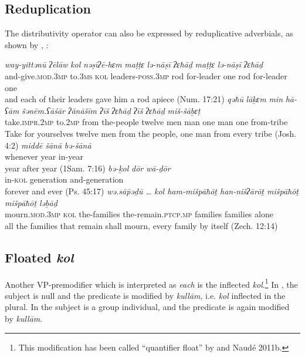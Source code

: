 \documentclass[output=paper]{langsci/langscibook}
\begin{document}
\subsection{Reduplication}%
The distributivity operator can also be expressed by reduplicative adverbials, as shown by \citealt{BeckStechow2006}, \citealt{NaudeMillerNaude2015}:

\ea%
    \label{ex:doron:48}
    \ea
    \gll \textit{way-yittənū}             \textit{ʔēlāw}   \textit{kol}  \textit{nəṣīʔē-hɛm}           \textit{maṭṭɛ} \textit{lə-nāṣī}      \textit{ʔɛħāḏ} \textit{maṭṭɛ} \textit{lə-nāṣī}    \textit{ʔɛħāḏ}\\
         and-give.\textsc{mod.3mp}  to.\textsc{3ms}  \textsc{kol} leaders-\textsc{poss.3mp} rod  for-leader one    rod   for-leader one\\
    \glt and each of their leaders gave him a rod apiece (Num. 17:21)
    \ex  
    \gll \textit{qəħū}                  \textit{lāḵɛm}  \textit{min}   \textit{hā-ʕām}      \textit{šənēm.ʕāśār} \textit{ʔănāšīm} \textit{ʔīš}    \textit{ʔɛħāḏ}  \textit{ʔīš}    \textit{ʔɛħāḏ}  \textit{miš-šāḇɛṭ}\\
         take.\textsc{impr.2mp}  to.2\textsc{mp} from the-people twelve           men       man one      man one    from-tribe\\
    \glt Take for yourselves twelve men from the people, one man from every tribe (Josh. 4:2)
    \ex  
    \gll \textit{middē}       \textit{šānā}  \textit{bə-šānā}\\
         whenever year  in-year \\
    \glt year after year (1Sam. 7:16)
    \ex  
    \gll \textit{bə-ḵol}  \textit{dōr}             \textit{wā-ḏōr}\\
         in-\textsc{kol} generation and-generation     \\
    \glt forever and ever  (Ps. 45:17)  
    \ex  
    \gll \textit{wə.sā\={p}əḏū …       kol  ham-mišpāħōṯ  han-nišʔārōṯ             mišpāħōṯ mišpāħōṯ ləḇāḏ}\\
         mourn.\textsc{mod.3mp}  \textsc{kol} the-families     the-remain.\textsc{ptcp.mp}  families families   alone   \\
    \glt all the families that remain shall mourn, every family by itself (Zech. 12:14)
    \z
\z

\subsection{Floated \textit{kol}}%
Another VP-premodifier which is interpreted as \textit{each} is the inflected \textit{kol}.\footnote{This modification has been called “quantifier float” by \citealt{Shlonsky1991} and Naud\textrm{é 2011b.}} In , the subject is null and the predicate is modified by \textit{kullām}, i.e. \textit{kol} inflected in the plural. In  the subject is a group individual, and the predicate is again modified by \textit{kullām}. 
\end{document}
